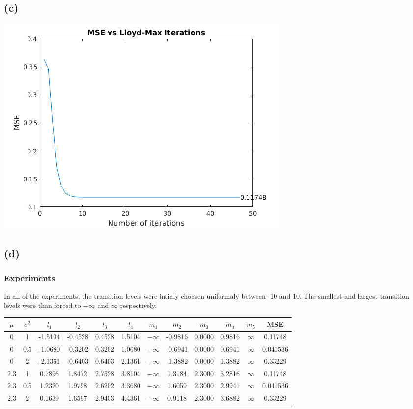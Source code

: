\documentclass[a4paper,fleqn,11pt]{article}
\theoremstyle{mytheor}
\begin{document}
\subsection*{(c)}
\begin{center}
\includegraphics[scale=0.70]{../results/lloyd.png}
\end{center}
\subsection*{(d)}
\subsubsection*{Experiments}
In all of the experiments, the transition levels were intialy choosen uniformaly between -10 and 10. The smallest and largest transition levels were than forced to $-\infty$ and $\infty$ respectively. \\
\begin{tabular}{| c | c | c | c | c | c | c | c | c | c | c | c |}
	\hline
	$\mu$ &	$\sigma^2$ &$l_1$ &		$l_2$ &		$l_3$ &		$l_4$ &		$m_1$ &		$m_2$ &			$m_3$ &		$m_4$ &		$m_5$ &		MSE \\
	\hline
	0 &		1 &			-1.5104 &	-0.4528 &	0.4528 &	1.5104 &	$-\infty$ &	-0.9816 &	0.0000 &	0.9816 &	$\infty$ &	0.11748 \\
	\hline
	0 &		0.5 &		-1.0680 &	-0.3202 &	0.3202 &	1.0680 &	$-\infty$ &	-0.6941 &	0.0000 &	0.6941 &	$\infty$ &	0.041536 \\
	\hline
	0 &		2 &			-2.1361 &  	-0.6403 & 	0.6403 & 	2.1361 &	$-\infty$ &	-1.3882 &	0.0000 &	1.3882 &	$\infty$ &	0.33229 \\
	\hline
	2.3 &   1 &			0.7896 &	1.8472 &	2.7528 &	3.8104 &	$-\infty$ &	1.3184 &	2.3000 &	3.2816 &	$\infty$ &	0.11748 \\
	\hline
	2.3 &	0.5 &		1.2320 &	1.9798 &	2.6202 &	3.3680 &	$-\infty$ &	1.6059 &	2.3000 &	2.9941 &	$\infty$ &	0.041536 \\
	\hline
	2.3 &	2 &			0.1639 &	1.6597 & 	2.9403 &	4.4361 &	$-\infty$ &	0.9118 &	2.3000 &	3.6882 &	$\infty$ &	0.33229 \\
	\hline
\end{tabular}
\end{document}
